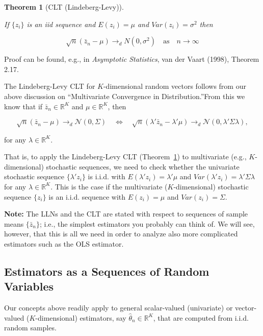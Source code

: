 \documentclass[
  letterpaper,
  DIV=11,
  numbers=noendperiod]{scrreprt}
\theoremstyle{definition}
\theoremstyle{plain}
\newtheorem{theorem}{Theorem}[chapter]
\theoremstyle{plain}
\theoremstyle{remark}
\begin{document}
\leavevmode{}%
\begin{theorem}[CLT (Lindeberg-Levy)]\label{thm-CLT1}

If \(\{z_i\}\) is an iid sequence and \(E(z_i)=\mu\) and
\(Var(z_i)=\sigma^2\) then

\[
\sqrt{n}(\bar{z}_n-\mu)\to_{d} N(0,\sigma^2)\quad\text{as}\quad n\to\infty
\]

\end{theorem}

Proof can be found, e.g., in \emph{Asymptotic Statistics}, van der Vaart
(1998), Theorem 2.17.

The Lindeberg-Levy CLT for \(K\)-dimensional random vectors follows from
our above discussion on ``Multivariate Convergence in
Distribution.''From this we know that if \(\bar{z}_n\in\mathbb{R}^K\)
and \(\mu\in\mathbb{R}^K\), then

\[\sqrt{n}(\bar{z}_n-\mu)\to_{d} \mathcal{N}(0,\Sigma)\quad\Leftrightarrow\quad \sqrt{n}(\lambda'\bar{z}_n-\lambda'\mu)\to_{d} \mathcal{N}(0,\lambda'\Sigma\lambda),\]

for any \(\lambda\in\mathbb{R}^K\).

That is, to apply the Lindeberg-Levy CLT (Theorem~\ref{thm-CLT1}) to
multivariate (e.g., \(K\)-dimensional) stochastic sequences, we need to
check whether the univariate stochastic sequence \(\{\lambda'z_i\}\) is
i.i.d. with \(E(\lambda'z_i)=\lambda'\mu\) and
\(Var(\lambda'z_i)=\lambda'\Sigma\lambda\) for any
\(\lambda\in\mathbb{R}^K\). This is the case if the multivariate
(\(K\)-dimensional) stochastic sequence \(\{z_i\}\) is an i.i.d.
sequence with \(E(z_i)=\mu\) and \(Var(z_i)=\Sigma\).

\textbf{Note:} The LLNs and the CLT are stated with respect to sequences
of sample means \(\{\bar{z}_n\}\); i.e., the simplest estimators you
probably can think of. We will see, however, that this is all we need in
order to analyze also more complicated estimators such as the OLS
estimator.

\hypertarget{estimators-as-a-sequences-of-random-variables}{%
\subsection{Estimators as a Sequences of Random
Variables}\label{estimators-as-a-sequences-of-random-variables}}

Our concepts above readily apply to general scalar-valued (univariate)
or vector-valued (\(K\)-dimensional) estimators, say
\(\hat\theta_n\in\mathbb{R}^K\), that are computed from i.i.d. random
samples.
\end{document}
